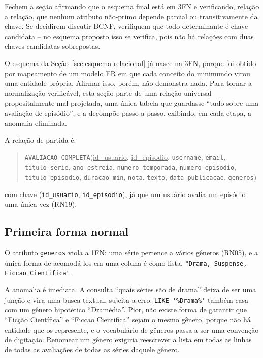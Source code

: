 \documentclass[a4paper,12pt,oneside,openany]{book}
\newcommand{\id}[1]{\texttt{#1}}
\begin{document}
{Fechem a seção afirmando que o esquema final está em 3FN e verificando, relação a
relação, que nenhum atributo não-primo depende parcial ou transitivamente da
chave. Se decidirem discutir BCNF, verifiquem que todo determinante é chave
candidata -- no esquema proposto isso se verifica, pois não há relações com duas
chaves candidatas sobrepostas.}

O esquema da Seção~\ref{sec:esquema-relacional} já nasce na 3FN, porque foi obtido
por mapeamento de um modelo ER em que cada conceito do minimundo virou uma entidade
própria. Afirmar isso, porém, não demonstra nada. Para tornar a normalização
verificável, esta seção parte de uma relação universal propositalmente mal
projetada, uma única tabela que guardasse ``tudo sobre uma avaliação de episódio'',
e a decompõe passo a passo, exibindo, em cada etapa, a anomalia eliminada.

A relação de partida é:

\begin{quote}
\id{AVALIACAO\_COMPLETA}(\underline{id\_usuario}, \underline{id\_episodio},
\id{username}, \id{email}, \id{titulo\_serie}, \id{ano\_estreia},
\id{numero\_temporada}, \id{numero\_episodio}, \id{titulo\_episodio},
\id{duracao\_min}, \id{nota}, \id{texto}, \id{data\_publicacao}, \id{generos})
\end{quote}

com chave (\id{id\_usuario}, \id{id\_episodio}), já que um usuário avalia um
episódio uma única vez (RN19).

\subsection{Primeira forma normal}

O atributo \id{generos} viola a 1FN: uma série pertence a vários gêneros (RN05), e a
única forma de acomodá-los em uma coluna é como lista,
\verb|"Drama, Suspense, Ficcao Cientifica"|.

A anomalia é imediata. A consulta ``quais séries são de drama'' deixa de ser uma
junção e vira uma busca textual, sujeita a erro: \verb|LIKE '%Drama%'| também casa com
um gênero hipotético ``Dramédia''. Pior, não existe forma de garantir que ``Ficção
Científica'' e ``Ficcao Cientifica'' sejam o mesmo gênero, porque não há entidade que
os represente, e o vocabulário de gêneros passa a ser uma convenção de digitação.
Renomear um gênero exigiria reescrever a lista em todas as linhas de todas as
avaliações de todas as séries daquele gênero.
\end{document}

